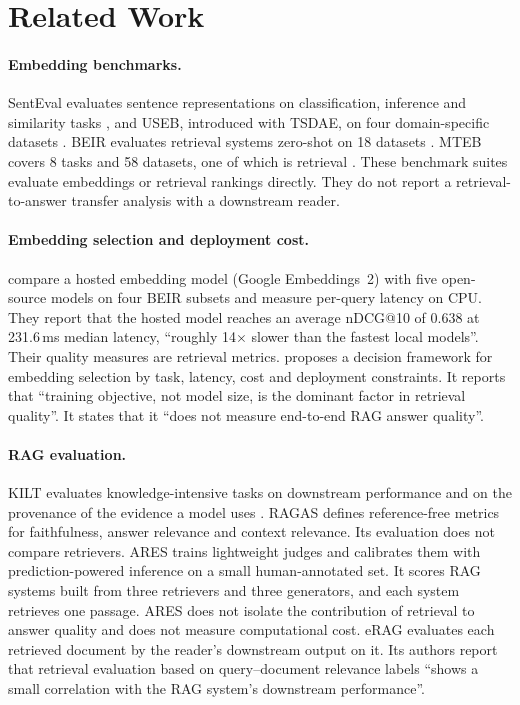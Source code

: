 \section{Related Work}
\label{sec:related}

\paragraph{Embedding benchmarks.}
SentEval evaluates sentence representations on classification, inference and similarity tasks \citep{conneau2018senteval}, and USEB, introduced with TSDAE, on four domain-specific datasets \citep{wang2021tsdae}.
BEIR evaluates retrieval systems zero-shot on 18 datasets \citep{thakur2021beir}.
MTEB covers 8 tasks and 58 datasets, one of which is retrieval \citep{muennighoff2022mteb}.
These benchmark suites evaluate embeddings or retrieval rankings directly.
They do not report a retrieval-to-answer transfer analysis with a downstream reader.

\paragraph{Embedding selection and deployment cost.}
\citet{cirillo2026ge2} compare a hosted embedding model (Google Embeddings~2) with five open-source models on four BEIR subsets and measure per-query latency on CPU.
They report that the hosted model reaches an average nDCG@10 of 0.638 at 231.6\,ms median latency, ``roughly 14$\times$ slower than the fastest local models''.
Their quality measures are retrieval metrics.
\citet{baidya2026choosing} proposes a decision framework for embedding selection by task, latency, cost and deployment constraints.
It reports that ``training objective, not model size, is the dominant factor in retrieval quality''.
It states that it ``does not measure end-to-end RAG answer quality''.

\paragraph{RAG evaluation.}
KILT evaluates knowledge-intensive tasks on downstream performance and on the provenance of the evidence a model uses \citep{petroni2021kilt}.
RAGAS \citep{es2023ragas} defines reference-free metrics for faithfulness, answer relevance and context relevance.
Its evaluation does not compare retrievers.
ARES \citep{saadfalcon2024ares} trains lightweight judges and calibrates them with prediction-powered inference on a small human-annotated set.
It scores RAG systems built from three retrievers and three generators, and each system retrieves one passage.
ARES does not isolate the contribution of retrieval to answer quality and does not measure computational cost.
eRAG \citep{salemi2024erag} evaluates each retrieved document by the reader's downstream output on it.
Its authors report that retrieval evaluation based on query--document relevance labels ``shows a small correlation with the RAG system's downstream performance''.


